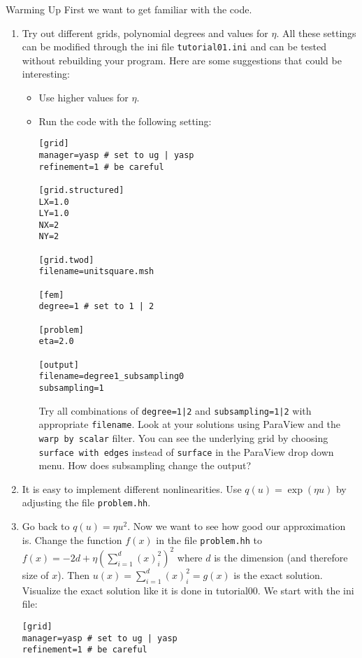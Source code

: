 \documentclass[12pt,a4paper]{article}
\begin{document}
\begin{Exercise}{Warming Up}
  First we want to get familiar with the code.
  \begin{enumerate}
  \item Try out different grids, polynomial degrees and values for
    $\eta$.  All these settings can be modified through the ini file
    \lstinline{tutorial01.ini} and can be tested without
    rebuilding your program.  Here are some suggestions that could be
    interesting:
    \begin{itemize}
    \item Use higher values for $\eta$.

    \item Run the code with the following setting:
      \begin{lstlisting}
[grid]
manager=yasp # set to ug | yasp
refinement=1 # be careful

[grid.structured]
LX=1.0
LY=1.0
NX=2
NY=2

[grid.twod]
filename=unitsquare.msh

[fem]
degree=1 # set to 1 | 2

[problem]
eta=2.0

[output]
filename=degree1_subsampling0
subsampling=1
      \end{lstlisting}
      Try all combinations of \lstinline{degree=1|2} and
      \lstinline{subsampling=1|2} with appropriate
      \lstinline{filename}.  Look at your solutions using ParaView and
      the \lstinline{warp by scalar} filter.  You can see the
      underlying grid by choosing \lstinline{surface with edges}
      instead of \lstinline{surface} in the ParaView drop down menu.
      How does subsampling change the output?
    \end{itemize}

  \item It is easy to implement different nonlinearities.  Use
    $q(u)=\exp(\eta u)$ by adjusting the file \lstinline{problem.hh}.

  \item Go back to $q(u)=\eta u^2$.  Now we want to see how good our
    approximation is.  Change the function $f(x)$ in the file
    \lstinline{problem.hh} to $f(x)=-2d+\eta(\sum_{i=1}^d(x)_i^2)^2$
    where $d$ is the dimension (and therefore size of $x$).  Then
    $u(x)=\sum_{i=1}^d(x)_i^2=g(x)$ is the exact solution.  Visualize the
    exact solution like it is done in tutorial00. We start with the
    ini file:
    \begin{lstlisting}
[grid]
manager=yasp # set to ug | yasp
refinement=1 # be careful


\end{lstlisting}
\end{enumerate}
\end{Exercise}
\end{document}
